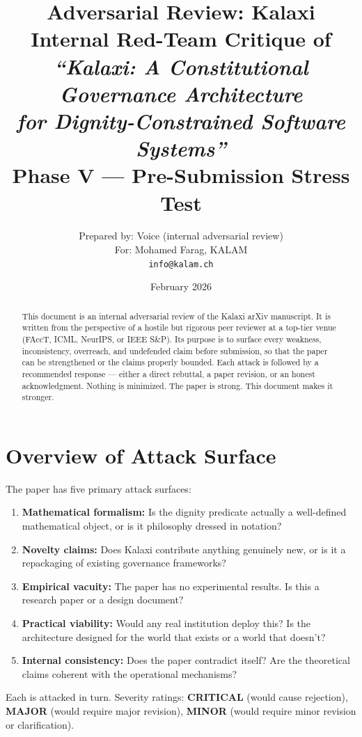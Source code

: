 \documentclass[12pt,a4paper]{article}
\title{\textbf{Adversarial Review: Kalaxi}\\\large
  Internal Red-Team Critique of\\
  \emph{``Kalaxi: A Constitutional Governance Architecture\\
  for Dignity-Constrained Software Systems''}\\[0.5em]
  \normalsize Phase V — Pre-Submission Stress Test}
\author{
  Prepared by: Voice (internal adversarial review)\\
  For: Mohamed Farag, KALAM\\
  \texttt{info@kalam.ch}
}
\date{February 2026}
\theoremstyle{definition}
\begin{document}
\maketitle
\thispagestyle{empty}

\begin{abstract}
This document is an internal adversarial review of the Kalaxi arXiv manuscript.
It is written from the perspective of a hostile but rigorous peer reviewer at a
top-tier venue (FAccT, ICML, NeurIPS, or IEEE S\&P). Its purpose is to surface every
weakness, inconsistency, overreach, and undefended claim before submission, so that
the paper can be strengthened or the claims properly bounded. Each attack is followed
by a recommended response — either a direct rebuttal, a paper revision, or an honest
acknowledgment. Nothing is minimized. The paper is strong. This document makes it
stronger.
\end{abstract}

\tableofcontents
\newpage

\section{Overview of Attack Surface}

The paper has five primary attack surfaces:

\begin{enumerate}
\item \textbf{Mathematical formalism:} Is the dignity predicate actually a
  well-defined mathematical object, or is it philosophy dressed in notation?
\item \textbf{Novelty claims:} Does Kalaxi contribute anything genuinely new,
  or is it a repackaging of existing governance frameworks?
\item \textbf{Empirical vacuity:} The paper has no experimental results.
  Is this a research paper or a design document?
\item \textbf{Practical viability:} Would any real institution deploy this?
  Is the architecture designed for the world that exists or a world that doesn't?
\item \textbf{Internal consistency:} Does the paper contradict itself?
  Are the theoretical claims coherent with the operational mechanisms?
\end{enumerate}

Each is attacked in turn. Severity ratings: \textbf{CRITICAL} (would cause rejection),
\textbf{MAJOR} (would require major revision), \textbf{MINOR} (would require minor
revision or clarification).
\end{document}
